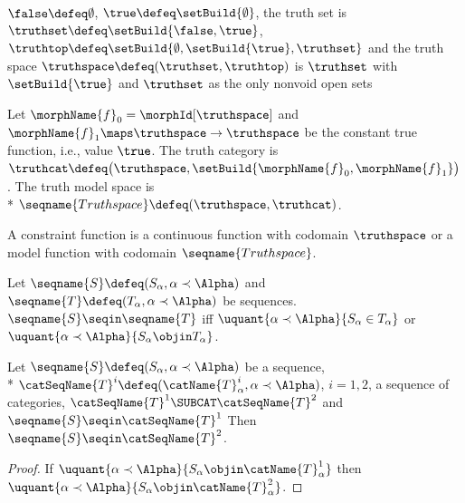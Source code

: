\documentclass{article}
\begin{document}
\begin{definition}
$\false \defeq \emptyset$, $\true \defeq \setBuild{\emptyset}$,
the truth set is \linebreak
$\truthset \defeq \setBuild{\false, \true}$,
$\truthtop \defeq \setBuild {\emptyset, \setBuild{\true}, \truthset}$ and
the truth space $\truthspace \defeq (\truthset, \truthtop)$ is
$\truthset$ with $\setBuild{\true}$ and $\truthset$ as the only nonvoid open
sets
\end{definition}

\begin{definition}
\label{def:truthcat}
Let $\morphName{f}_0 = \morphId[\truthspace]$ and
$\morphName{f}_1 \maps \truthspace \to \truthspace$ be the constant true
function, i.e., value $\true$.  The truth category is
$
   \truthcat \defeq \\
   \bigl (
     \truthspace,
     \setBuild{\morphName{f}_0, \morphName{f}_1}
   \bigr )
$.
The truth model space is \\*
$\seqname{Truthspace} \defeq (\truthspace, \truthcat)$.
\end{definition}

\begin{definition}
A constraint function is a continuous function with codomain
$\truthspace$ or a model
function with codomain $\seqname{Truthspace}$.
\end{definition}

\begin{definition}
\label{def:seqin}
Let $\seqname{S} \defeq (S_\alpha, \alpha \prec \Alpha)$ and
$\seqname{T} \defeq (T_\alpha, \alpha \prec \Alpha)$ be sequences.
$\seqname{S} \seqin \seqname{T}$ iff
$\uquant{\alpha \prec \Alpha} {S_\alpha \in T_\alpha}$ or
$\uquant{\alpha \prec \Alpha} {S_\alpha \objin T_\alpha}$.
\end{definition}

\begin{lemma}
\label{lem:seqin}
Let $\seqname{S} \defeq (S_\alpha, \alpha \prec \Alpha)$
be a sequence, \\*
\nobreaks
  {{
    $
      \catSeqName{T}^i \defeq
      (\catName{T}^i_\alpha, \alpha \prec \Alpha)
    $,
  }}
$i=1,2$, a sequence of
categories, $\catSeqName{T}^1 \SUBCAT \catSeqName{T}^2$ and
$\seqname{S} \seqin \catSeqName{T}^1$ Then
$\seqname{S} \seqin \catSeqName{T}^2$.

\begin{proof}
If
$\uquant{\alpha \prec \Alpha} {S_\alpha \objin \catName{T}^1_\alpha}$
then
$\uquant{\alpha \prec \Alpha} {S_\alpha \objin \catName{T}^2_\alpha}$.
\end{proof}
\end{lemma}
\end{document}

